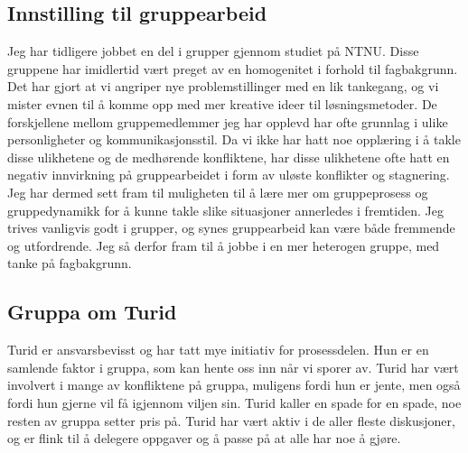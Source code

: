 \subsection*{Innstilling til gruppearbeid}
Jeg har tidligere jobbet en del i grupper gjennom studiet på NTNU. Disse
gruppene har imidlertid vært preget av en homogenitet i forhold til fagbakgrunn.
Det har gjort at vi angriper nye problemstillinger med en lik tankegang, og vi
mister evnen til å komme opp med mer kreative ideer til løsningsmetoder. De
forskjellene mellom gruppemedlemmer jeg har opplevd har ofte
grunnlag i ulike personligheter og kommunikasjonsstil. Da vi ikke har hatt noe
opplæring i å takle disse ulikhetene og de medhørende konfliktene, har
disse ulikhetene ofte hatt en negativ innvirkning på gruppearbeidet i form av
uløste konflikter og stagnering. Jeg har dermed sett fram til muligheten til å
lære mer om gruppeprosess og gruppedynamikk for å kunne takle slike
situasjoner annerledes i fremtiden. Jeg trives vanligvis godt i grupper, og synes
gruppearbeid kan være både fremmende og utfordrende. Jeg så derfor fram til å
jobbe i en mer heterogen gruppe, med tanke på fagbakgrunn.


%

\subsection*{Gruppa om Turid}
Turid er ansvarsbevisst og har tatt mye initiativ for prosessdelen. Hun er en
samlende faktor i gruppa, som kan hente oss inn når vi sporer av. Turid har vært
involvert i mange av konfliktene på gruppa, muligens fordi hun er jente,
men også fordi hun gjerne vil få igjennom viljen sin. Turid kaller en spade for
en spade, noe resten av gruppa setter pris på. Turid har vært aktiv i de aller
fleste diskusjoner, og er flink til å delegere oppgaver og å passe på at alle
har noe å gjøre.

